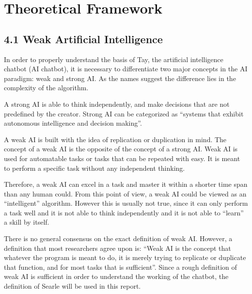 \chapter{Theoretical Framework}

\section*{\textbf{4.1 Weak Artificial Intelligence}}
In order to properly understand the basis of Tay, the artificial intelligence chatbot (AI chatbot), it is necessary to differentiate two major concepts in the AI paradigm: weak and strong AI. As the names suggest the difference lies in the complexity of the algorithm. 

A strong AI is able to think independently, and make decisions that are not predefined by the creator. Strong AI can be categorized as “systems that exhibit autonomous intelligence and decision making”\cite{AIdefinitions}.

A weak AI is built with the idea of replication or duplication in mind. The concept of a weak AI is the opposite of the concept of a strong AI. Weak AI is used for automatable tasks or tasks that can be repeated with easy. It is meant to perform a specific task without any independent thinking. 

Therefore, a weak AI can excel in a task and master it within a shorter time span than any human could. From this point of view, a weak AI could be viewed as an “intelligent” algorithm. However this is usually not true, since it can only perform a task well and it is not able to think independently and it is not able to “learn” a skill by itself. 

There is no general consensus on the exact definition of weak AI. However, a definition that most researchers agree upon is: “Weak AI is the concept that whatever the program is meant to do, it is merely trying to replicate or duplicate that function, and for most tasks that is sufficient”\cite{searleAIdefinition}. Since a rough definition of weak AI is sufficient in order to understand the working of the chatbot, the definition of Searle will be used in this report.

\newpage

